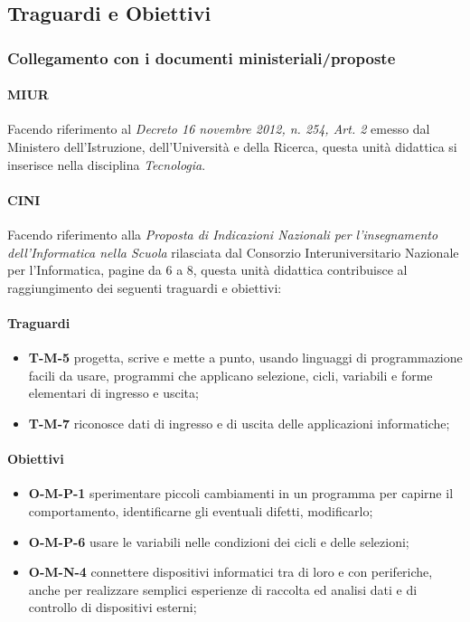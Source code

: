 \documentclass[../../relazione.tex]{subfiles}
\begin{document}
\subsection{Traguardi e Obiettivi}

\subsubsection{Collegamento con i documenti ministeriali/proposte}
\paragraph{MIUR}
Facendo riferimento al \textit{Decreto 16 novembre 2012, n. 254, Art. 2} \cite{MIURWeb, MIUR254} emesso dal Ministero dell'Istruzione, dell'Università e della Ricerca, questa unità didattica si inserisce nella disciplina \textit{Tecnologia}.

\paragraph{CINI}
Facendo riferimento alla \textit{Proposta di Indicazioni Nazionali per l'insegnamento dell'Informatica nella Scuola} \cite{CINI} rilasciata dal Consorzio Interuniversitario Nazionale per l'Informatica, pagine da 6 a 8, questa unità didattica contribuisce al raggiungimento dei seguenti traguardi e obiettivi:
\paragraph{Traguardi}
\begin{itemize}
	\item \textbf{T-M-5} progetta, scrive e mette a punto, usando linguaggi di programmazione facili da usare, programmi che applicano selezione, cicli, variabili e forme elementari di ingresso e uscita;
	\item \textbf{T-M-7} riconosce dati di ingresso e di uscita delle applicazioni informatiche;
\end{itemize}
\paragraph{Obiettivi}
\begin{itemize}
	\item \textbf{O-M-P-1} sperimentare piccoli cambiamenti in un programma per capirne il comportamento, identificarne gli eventuali difetti, modificarlo;
	\item \textbf{O-M-P-6} usare le variabili nelle condizioni dei cicli e delle selezioni;
	\item \textbf{O-M-N-4} connettere dispositivi informatici tra di loro e con periferiche, anche per realizzare semplici esperienze di raccolta ed analisi dati e di controllo di dispositivi esterni;
\end{itemize}
\end{document}
